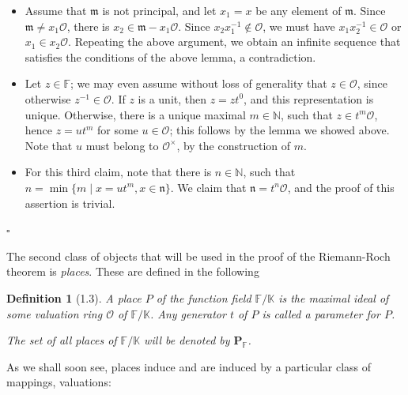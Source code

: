 \documentclass[11pt]{article}
\theoremstyle{scplain}
\newtheorem*{definition}{Definition}
\begin{document}
\begin{itemize}
\item[(a)] Assume that $\mathfrak{m}$ is not principal, and let $x_1 = x$ be any
  element of $\mathfrak{m}$. Since $\mathfrak{m} \neq x_1 \mathcal{O}$, there is
  $x_2 \in \mathfrak{m} - x_1 \mathcal{O}$. Since $x_2 x_1^{-1} \notin \mathcal{O}$,
  we must have $x_1 x_2^{-1} \in \mathcal{O}$ or $x_1 \in x_2 \mathcal{O}$.
  Repeating the above argument, we obtain an infinite sequence that satisfies the
  conditions of the above lemma, a contradiction.

\item[(b)] Let $z \in \mathbb{F}$; we may even assume without loss of generality
  that $z \in \mathcal{O}$, since otherwise $z^{-1} \in \mathcal{O}$. If $z$ is a
  unit, then $z = z t^0$, and this representation is unique. Otherwise, there is a
  unique maximal $m \in \mathbb{N}$, such that $z \in t^m \mathcal{O}$, hence
  $z = u t^m$ for some $u \in \mathcal{O}$; this follows by the lemma we showed
  above. Note that $u$ must belong to $\mathcal{O}^\times$, by the construction of
  $m$.

\item[(c)] For this third claim, note that there is $n \in \mathbb{N}$, such that
  $n = \min\{m \mid x = u t^m, x \in \mathfrak{n}\}$. We claim that
  $\mathfrak{n} = t^n \mathcal{O}$, and the proof of this assertion is trivial.
\end{itemize}

\begin{flushright}$\square$\end{flushright}

\medskip
The second class of objects that will be used in the proof of the Riemann-Roch
theorem is \emph{places}. These are defined in the following

\begin{definition}[1.3]
A place $P$ of the function field $\mathbb{F}/\mathbb{K}$ is the maximal ideal of
some valuation ring $\mathcal{O}$ of $\mathbb{F}/\mathbb{K}$. Any generator $t$ of
$P$ is called a parameter for $P$.

\indent The set of all places of $\mathbb{F}/\mathbb{K}$ will be denoted by
$\mathbf{P}_{\mathbb{F}}$.
\end{definition}

As we shall soon see, places induce and are induced by a particular class of
mappings, valuations:
\end{document}
